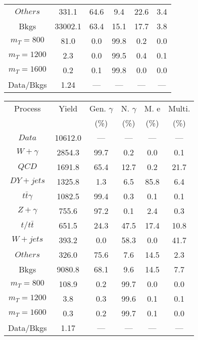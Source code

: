 \begin{figure}
\begin{minipage}[c]{0.32\textwidth}
{\begin{tabular}{cccccc}
$ Others $ &  331.1 &  64.6 &  9.4 &  22.6 &  3.4\\
Bkgs &  33002.1 &  63.4 &  15.1 &  17.7 &  3.8\\
$ m_{T} = 800 $ &  81.0 &  0.0 &  99.8 &  0.2 &  0.0\\
$ m_{T} = 1200 $ &  2.3 &  0.0 &  99.5 &  0.4 &  0.1\\
$ m_{T} = 1600 $ &  0.2 &  0.1 &  99.8 &  0.0 &  0.0\\
Data/Bkgs &  1.24 &  --- &  --- &  --- &  ---\\
\hline
\end{tabular}
}
\end{minipage}
\begin{minipage}[c]{0.32\textwidth}
\centering
\tiny{
\begin{tabular}{cccccc}
\hline
Process & Yield & Gen. $\gamma$ & N. $\gamma$ & M. e & Multi. \\
 &  & (\%) & (\%) & (\%) & (\%)  \\
\hline
                                                                      $ Data $ &  10612.0 &  --- &  --- &  --- &  ---\\
$ W+\gamma $ &  2854.3 &  99.7 &  0.2 &  0.0 &  0.1\\
$ QCD $ &  1691.8 &  65.4 &  12.7 &  0.2 &  21.7\\
$ DY+jets $ &  1325.8 &  1.3 &  6.5 &  85.8 &  6.4\\
$ t\bar{t}\gamma $ &  1082.5 &  99.4 &  0.3 &  0.1 &  0.1\\
$ Z+\gamma $ &  755.6 &  97.2 &  0.1 &  2.4 &  0.3\\
$ t/t\bar{t} $ &  651.5 &  24.3 &  47.5 &  17.4 &  10.8\\
$ W+jets $ &  393.2 &  0.0 &  58.3 &  0.0 &  41.7\\
$ Others $ &  326.0 &  75.6 &  7.6 &  14.5 &  2.3\\
Bkgs &  9080.8 &  68.1 &  9.6 &  14.5 &  7.7\\
$ m_{T} = 800 $ &  108.9 &  0.2 &  99.7 &  0.0 &  0.0\\
$ m_{T} = 1200 $ &  3.8 &  0.3 &  99.6 &  0.1 &  0.1\\
$ m_{T} = 1600 $ &  0.3 &  0.2 &  99.7 &  0.1 &  0.0\\
Data/Bkgs &  1.17 &  --- &  --- &  --- &  ---\\
\hline
\end{tabular}
}
\end{minipage}
\begin{minipage}[c]{0.32\textwidth}
\centering

\end{minipage}
\end{figure}
